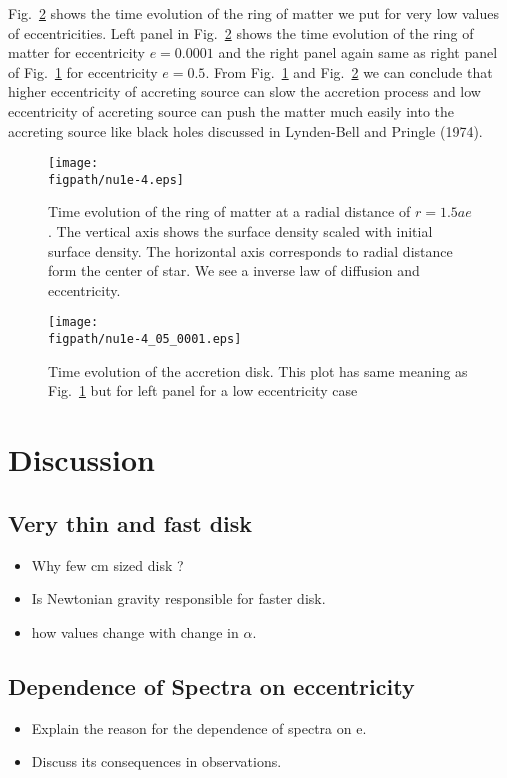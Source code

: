 \documentclass[useAMS,usenatbib]{mn2e}
\newcommand{\figpath}{./Figs/}
\begin{document}
Fig.~\ref{evolve1e-4} shows the time evolution of the ring of matter we put for very low values of eccentricities. Left panel in Fig.~\ref{evolve1e-4} shows the time evolution of the ring of matter for eccentricity $e = 0.0001$ and the right panel again same as right panel of Fig.~\ref{evolve} for eccentricity $e = 0.5$. From Fig.~\ref{evolve} and Fig.~\ref{evolve1e-4} we can conclude that higher eccentricity of accreting source can slow the accretion process and low eccentricity of accreting source can push the matter much easily into the accreting source like black holes discussed in Lynden-Bell and Pringle (1974).  
\begin{figure}
\centering
\texttt{[image: \\figpath/nu1e-4.eps]}
\caption{Time evolution of the ring of matter at a radial distance of $r = 1.5 ae$. The vertical axis shows the surface density scaled with initial surface density. The horizontal axis corresponds to radial distance form the center of star. We see a inverse law of diffusion and eccentricity.}
\label{evolve}
\end{figure}
\begin{figure}
\centering
\texttt{[image: \\figpath/nu1e-4\_05\_0001.eps]}
\caption{Time evolution of the accretion disk. This plot has same meaning as Fig.~\ref{evolve} but for left panel for a low eccentricity case}
\label{evolve1e-4}
\end{figure}
\section{Discussion}
\subsection{Very thin and fast disk}
\begin{itemize}
\item Why few cm sized disk ?
\item Is Newtonian gravity responsible for faster disk. 
\item how values change with change in $\alpha$. 
\end{itemize}
\subsection{Dependence of Spectra on eccentricity}
\begin{itemize}
\item Explain the reason for the dependence of spectra on e. 
\item Discuss its consequences in observations.
\end{itemize}
\end{document}
